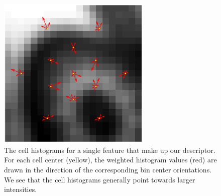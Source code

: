 \documentclass[thesis.tex]{subfiles}
\begin{document}
\begin{figure}[tb]
    \centering
    \includegraphics[width=0.65\textwidth]{img/cellHistFigure.pdf}
    \caption{The cell histograms for a single feature that make up our descriptor. For each cell center (yellow), the weighted histogram values (red) are drawn in the direction of the corresponding bin center orientations. We see that the cell histograms generally point towards larger intensities.}
    \label{fig:cellHistFigureGoM}
\end{figure}
\end{document}
